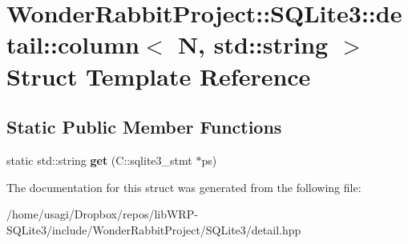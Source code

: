 \hypertarget{structWonderRabbitProject_1_1SQLite3_1_1detail_1_1column_3_01N_00_01std_1_1string_01_4}{\section{Wonder\-Rabbit\-Project\-:\-:S\-Q\-Lite3\-:\-:detail\-:\-:column$<$ N, std\-:\-:string $>$ Struct Template Reference}
\label{structWonderRabbitProject_1_1SQLite3_1_1detail_1_1column_3_01N_00_01std_1_1string_01_4}
}
\subsection*{Static Public Member Functions}
\begin{DoxyCompactItemize}
\item 
\hypertarget{structWonderRabbitProject_1_1SQLite3_1_1detail_1_1column_3_01N_00_01std_1_1string_01_4_a2f09d4e78115704842981b2876d122b3}{static std\-::string {\bfseries get} (C\-::sqlite3\-\_\-stmt $\ast$ps)}\label{structWonderRabbitProject_1_1SQLite3_1_1detail_1_1column_3_01N_00_01std_1_1string_01_4_a2f09d4e78115704842981b2876d122b3}

\end{DoxyCompactItemize}


The documentation for this struct was generated from the following file\-:\begin{DoxyCompactItemize}
\item 
/home/usagi/\-Dropbox/repos/lib\-W\-R\-P-\/\-S\-Q\-Lite3/include/\-Wonder\-Rabbit\-Project/\-S\-Q\-Lite3/detail.\-hpp\end{DoxyCompactItemize}
